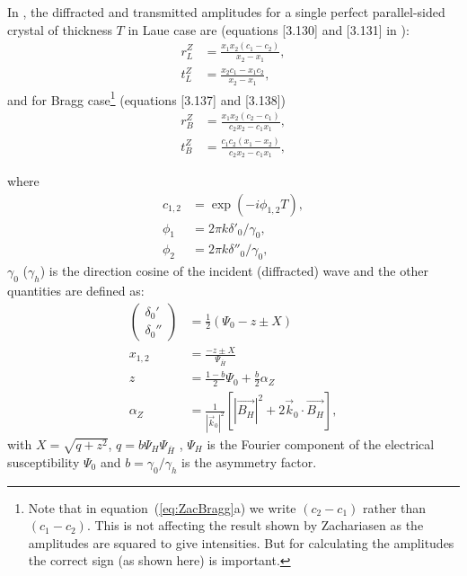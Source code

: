 \documentclass[preprint]{iucr}              %
\begin{document}
In \cite{ZachariasenBook}, the diffracted and transmitted amplitudes for a single perfect parallel-sided crystal of thickness $T$ in Laue case are (equations [3.130] and [3.131] in \cite{ZachariasenBook}):
 	\begin{subequations}
    \label{eq:ZacLaue}
    \begin{align}
    r^Z_L &= \frac{x_1 x_2 (c_1 - c_2)}{x_2-x_1}, \\
    t^Z_L &= \frac{x_2 c_1 - x_1 c_2}{x_2-x_1},
    \end{align}
	\end{subequations}
and for Bragg case\footnote{Note that in equation~(\ref{eq:ZacBragg}a) we write $(c_2-c_1)$ rather than $(c_1-c_2)$. This is not affecting the result shown by Zachariasen as the amplitudes are squared to give intensities. But for calculating the amplitudes the correct sign (as shown here) is important.} (equations [3.137] and [3.138]) 
	\begin{subequations}
	\label{eq:ZacBragg}
    \begin{align}
	r^Z_{B} &=  
	\frac{x_1 x_2 (c_2 - c_1)}{c_2 x_2-c_1 x_1}, \\
 	t^Z_{B} &=  
	\frac{c_1 c_2 (x_1 - x_2)}{c_2 x_2-c_1 x_1},    
    \end{align}
    \end{subequations}


where
\begin{subequations}
\begin{align}
c_{1,2} &=\exp(-i \phi_{1,2} T), \\
\phi_1 &= 2\pi k \delta'_0/\gamma_0, \\
\phi_2 &= 2\pi k \delta''_0/\gamma_0,
\end{align}
\end{subequations}
$\gamma_0$ ($\gamma_h$) is the direction cosine of the incident (diffracted) 
wave and the other quantities are defined as:
\begin{subequations}
\begin{align}
	\left( \begin{array}{ll}
               \delta_0' \\
               \delta_0''
	       \end{array} 
	\right)
	&= \frac{1}{2} \left( \Psi_0 - z\pm X \right)
\\
    x_{1,2}
	&= \frac{- z\pm X}{\Psi_{\bar{H}}}
 \\
	z &= \frac{1-b}{2} \Psi_0 + \frac{b}{2} \alpha_Z 
 \\
	\alpha_Z &= \frac{1}{|\vec{k}_0|^2} 
              \left[ |\vec{B_H}|^2 +
	       2 \vec{k}_0 \cdot \vec{B_H} \right],
\end{align}
\end{subequations}
with $X=\sqrt{q+z^2}$, $q=b\Psi_H\Psi_{\bar{H}}$ , 
$\Psi_H$ is the Fourier component of the
electrical susceptibility $\Psi_0$ and $b=\gamma_0/\gamma_h$ is the asymmetry
factor.
\end{document}
